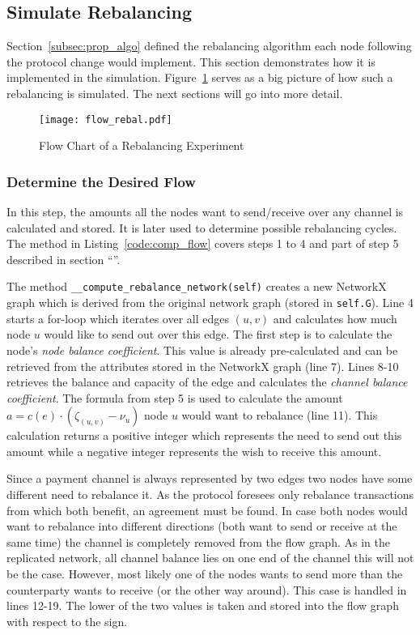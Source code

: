 \documentclass[final]{fhnwreport}       %
\begin{document}
\subsection{Simulate Rebalancing}\label{subsec:sim_rebal}
Section~\ref{subsec:prop_algo} defined the rebalancing algorithm each node following the protocol change would implement. This section demonstrates how it is implemented in the simulation. Figure~\ref{fig:flow_rebal} serves as a big picture of how such a rebalancing is simulated. The next sections will go into more detail. 

\begin{figure}[H]
\centering
\texttt{[image: flow\_rebal.pdf]}
\caption{Flow Chart of a Rebalancing Experiment}
\label{fig:flow_rebal}
\end{figure}

\subsubsection{Determine the Desired Flow}\label{subsub:flow}
In this step, the amounts all the nodes want to send/receive over any channel is calculated and stored. It is later used to determine possible rebalancing cycles. The method in Listing~\ref{code:comp_flow} covers steps 1 to 4 and part of step 5 described in section ``''.

The method \texttt{__compute_rebalance_network(self)} creates a new NetworkX graph which is derived from the original network graph (stored in \texttt{self.G}). Line 4 starts a for-loop which iterates over all edges $(u, v)$ and calculates how much node $u$ would like to send out over this edge. The first step is to calculate the node's \emph{node balance coefficient}. This value is already pre-calculated and can be retrieved from the attributes stored in the NetworkX graph (line 7). Lines 8-10 retrieves the balance and capacity of the edge and calculates the \emph{channel balance coefficient}. The formula from step 5 is used to calculate the amount $a = c(e)\cdot (\zeta_{(u,v)}-\nu_u)$ node $u$ would want to rebalance (line 11). This calculation returns a positive integer which represents the need to send out this amount while a negative integer represents the wish to receive this amount. 

Since a payment channel is always represented by two edges two nodes have some different need to rebalance it. As the protocol foresees only rebalance transactions from which both benefit, an agreement must be found. In case both nodes would want to rebalance into different directions (both want to send or receive at the same time) the channel is completely removed from the flow graph. As in the replicated network, all channel balance lies on one end of the channel this will not be the case. However, most likely one of the nodes wants to send more than the counterparty wants to receive (or the other way around). This case is handled in lines 12-19. The lower of the two values is taken and stored into the flow graph with respect to the sign.
\end{document}
